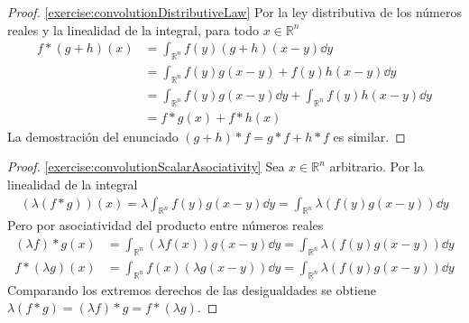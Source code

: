\documentclass{article}
\newcommand{\realNumbers}{\mathbb{R}}
\theoremstyle{remark}
\begin{document}
  \begin{proof}
    \ref{exercise:convolutionDistributiveLaw}
    Por la ley distributiva de los números reales y la linealidad de la integral, para todo \(x \in \realNumbers^n\)
    \begin{align}
      f * (g + h) (x)
      &=
      \int_{\realNumbers^n} f(y) (g + h) (x - y) \dd y
      \\
      &=
      \int_{\realNumbers^n} f(y) g(x - y) + f(y) h(x - y)  \dd y
      \\
      &=
      \int_{\realNumbers^n} f(y) g(x - y) \dd y + \int_{\realNumbers^n} f(y) h(x - y)  \dd y
      \\
      &=
      f * g (x) + f * h (x)
    \end{align}
    La demostración del enunciado \((g + h) * f = g * f + h * f\) es similar.
  \end{proof} 

  \begin{proof}
    \ref{exercise:convolutionScalarAsociativity}
    Sea \(x \in \realNumbers^n\) arbitrario.
    Por la linealidad de la integral
    \begin{align}
      (\lambda (f * g)) (x)
      =
      \lambda \int_{\realNumbers^n} f(y) g(x - y) \dd y
      =
      \int_{\realNumbers^n} \lambda (f(y) g(x - y)) \dd y
    \end{align}
    Pero por asociatividad del producto entre números reales
    \begin{align}
      (\lambda f) * g (x)
      &=
      \int_{\realNumbers^n} (\lambda f(x)) g(x - y) \dd y
      =
      \int_{\realNumbers^n} \lambda (f(y) g(x - y)) \dd y
      \\
      f * (\lambda g) (x)
      &=
      \int_{\realNumbers^n} f(x) (\lambda g(x - y)) \dd y
      =
      \int_{\realNumbers^n} \lambda (f(y) g(x - y)) \dd y      
    \end{align}
    Comparando los extremos derechos de las desigualdades se obtiene \(\lambda (f * g) = (\lambda f) * g = f * (\lambda g)\).
  \end{proof}
\end{document}
